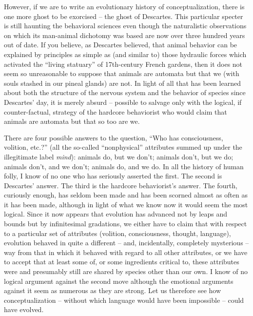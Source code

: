 However, if we are to write an evolutionary history of conceptualization, there is one more ghost to be exorcised -- the ghost of Descartes. This particular specter is still haunting the behavioral sciences even though the naturalistic observations on which its man-animal dichotomy was based are now over three hundred years out of date. If you believe, as Descartes believed, that animal behavior can be explained by principles as simple as (and similar to) those hydraulic forces which activated the ``living statuary'' of 17th-century French gardens, then it does not seem so unreasonable to suppose that animals are automata but that we (with souls stashed in our pineal glands) are not. In light of all that has been learned about both the structure of the nervous system and the behavior of species since Descartes' day, it is merely absurd -- possible to salvage only with the logical, if counter-factual, strategy of the hardcore behaviorist who would claim that animals are automata but that so too are we.

There are four possible answers to the question, ``Who has consciousness, volition, etc.?'' (all the so-called ``nonphysical'' attributes summed up under the illegitimate label \textit{mind}): animals do, but we don't; animals don't, but we do; animals don't, and we don't; animals do, and we do. In all the history of human folly, I know of no one who has seriously asserted the first. The second is Descartes' answer. The third is the hardcore behaviorist's answer. The fourth, curiously enough, has seldom been made and has been scorned almost as often as it has been made, although in light of what we know now it would seem the most logical. Since it now appears that evolution has advanced not by leaps and bounds but by infinitesimal gradations, we either have to claim that with respect to a particular set of attributes (volition, consciousness, thought, language), evolution behaved in quite a different -- and, incidentally, completely mysterious -- way from that in which it behaved with regard to all other attributes, or we have to accept that at least some of, or some ingredients critical to, these attributes were and presumably still are shared by species other than our own. I know of no logical argument against the second move although the emotional arguments against it seem as numerous as they are strong. Let us therefore see how conceptualization -- without which language would have been impossible -- could have evolved.

